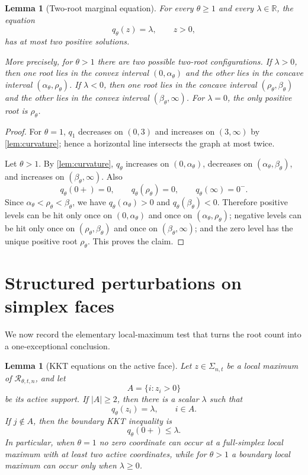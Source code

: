 \documentclass[11pt]{article}
\newtheorem{lemma}[theorem]{Lemma}
\theoremstyle{definition}
\newcommand{\R}{\mathbb R}
\begin{document}
\begin{lemma}[Two-root marginal equation]\label{lem:two-root}
For every $\theta\ge1$ and every $\lambda\in\R$, the equation
\[
  q_\theta(z)=\lambda,
  \qquad z>0,
\]
has at most two positive solutions.

More precisely, for $\theta>1$ there are two possible two-root configurations.  If $\lambda>0$, then one root lies in the convex interval $(0,\alpha_\theta)$ and the other lies in the concave interval $(\alpha_\theta,\rho_\theta)$.  If $\lambda<0$, then one root lies in the concave interval $(\rho_\theta,\beta_\theta)$ and the other lies in the convex interval $(\beta_\theta,\infty)$.  For $\lambda=0$, the only positive root is $\rho_\theta$.
\end{lemma}

\begin{proof}
For $\theta=1$, $q_1$ decreases on $(0,3)$ and increases on $(3,\infty)$ by \cref{lem:curvature}; hence a horizontal line intersects the graph at most twice.

Let $\theta>1$.  By \cref{lem:curvature}, $q_\theta$ increases on $(0,\alpha_\theta)$, decreases on $(\alpha_\theta,\beta_\theta)$, and increases on $(\beta_\theta,\infty)$.  Also
\[
  q_\theta(0+)=0,
  \qquad q_\theta(\rho_\theta)=0,
  \qquad q_\theta(\infty)=0^-.
\]
Since $\alpha_\theta<\rho_\theta<\beta_\theta$, we have $q_\theta(\alpha_\theta)>0$ and $q_\theta(\beta_\theta)<0$.  Therefore positive levels can be hit only once on $(0,\alpha_\theta)$ and once on $(\alpha_\theta,\rho_\theta)$; negative levels can be hit only once on $(\rho_\theta,\beta_\theta)$ and once on $(\beta_\theta,\infty)$; and the zero level has the unique positive root $\rho_\theta$.  This proves the claim.
\end{proof}

\section{Structured perturbations on simplex faces}

We now record the elementary local-maximum test that turns the root count into a one-exceptional conclusion.

\begin{lemma}[KKT equations on the active face]\label{lem:kkt}
Let $z\in\Sigma_{n,t}$ be a local maximum of $\mathcal R_{\theta,t,n}$, and let
\[
  A=\{i:z_i>0\}
\]
be its active support.  If $|A|\ge2$, then there is a scalar $\lambda$ such that
\[
  q_\theta(z_i)=\lambda,
  \qquad i\in A.
\]
If $j\notin A$, then the boundary KKT inequality is
\[
  q_\theta(0+)\le \lambda.
\]
In particular, when $\theta=1$ no zero coordinate can occur at a full-simplex local maximum with at least two active coordinates, while for $\theta>1$ a boundary local maximum can occur only when $\lambda\ge0$.
\end{lemma}
\end{document}
